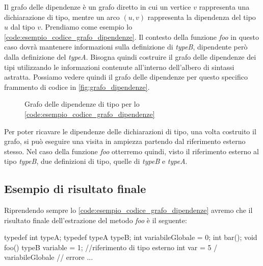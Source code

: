 Il grafo delle dipendenze è un grafo diretto in cui un vertice $v$ rappresenta una dichiarazione di tipo, mentre un arco $(u,v)$ rappresenta la dipendenza del tipo $u$ dal tipo $v$.
Prendiamo come esempio lo \autoref{code:esempio_codice_grafo_dipendenze}. 
Il contesto della funzione \textit{foo} in questo caso dovrà mantenere informazioni sulla definizione di \textit{typeB}, dipendente però dalla definizione del \textit{typeA}.
Bisogna quindi costruire il grafo delle dipendenze dei tipi utilizzando le informazioni contenute all'interno dell'albero di sintassi astratta.
Possiamo vedere quindi il grafo delle dipendenze per questo specifico frammento di codice in \autoref{fig:grafo_dipendenze}.


\begin{figure}[h]
  \centering
  \caption{Grafo delle dipendenze di tipo per lo \autoref{code:esempio_codice_grafo_dipendenze}}
  \label{fig:grafo_dipendenze}
\end{figure}

Per poter ricavare le dipendenze delle dichiarazioni di tipo, una volta costruito il grafo, si può eseguire una visita in ampiezza partendo dal riferimento esterno stesso.
Nel caso della funzione \textit{foo} otterremo quindi, visto il riferimento esterno al tipo \textit{typeB}, due definizioni di tipo, quelle di \textit{typeB} e \textit{typeA}.  

\subsection{Esempio di risultato finale}
Riprendendo sempre lo \autoref{code:esempio_codice_grafo_dipendenze} avremo che il risultato finale dell'estrazione del metodo \textit{foo} è il seguente:


\begin{code}[language=c++, caption={Esempio di estrazione del codice della funzione foo insieme al contesto}, label={code:esempio_finale}]

  typedef int typeA;
  typedef typeA typeB; 
  int variabileGlobale = 0;
  int bar();
  void foo(){
    typeB variable = 1; //riferimento di tipo esterno
    int var = 5 / variabileGlobale // errore
    ...
  }

\end{code}


